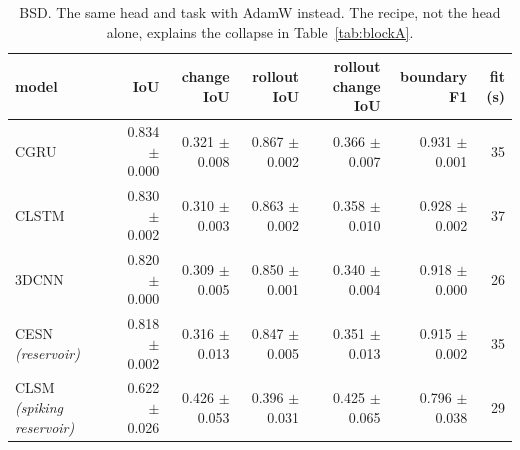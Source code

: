 \begin{table}[t]
\centering\small
\begin{tabular}{lrrrrrr}
\toprule
model & IoU & change IoU & rollout IoU & rollout change IoU & boundary F1 & fit (s) \\
\midrule
CGRU & 0.834 {\scriptsize$\pm$ 0.000} & 0.321 {\scriptsize$\pm$ 0.008} & 0.867 {\scriptsize$\pm$ 0.002} & 0.366 {\scriptsize$\pm$ 0.007} & 0.931 {\scriptsize$\pm$ 0.001} & 35 \\
CLSTM & 0.830 {\scriptsize$\pm$ 0.002} & 0.310 {\scriptsize$\pm$ 0.003} & 0.863 {\scriptsize$\pm$ 0.002} & 0.358 {\scriptsize$\pm$ 0.010} & 0.928 {\scriptsize$\pm$ 0.002} & 37 \\
3DCNN & 0.820 {\scriptsize$\pm$ 0.000} & 0.309 {\scriptsize$\pm$ 0.005} & 0.850 {\scriptsize$\pm$ 0.001} & 0.340 {\scriptsize$\pm$ 0.004} & 0.918 {\scriptsize$\pm$ 0.000} & 26 \\
CESN \emph{(reservoir)} & 0.818 {\scriptsize$\pm$ 0.002} & 0.316 {\scriptsize$\pm$ 0.013} & 0.847 {\scriptsize$\pm$ 0.005} & 0.351 {\scriptsize$\pm$ 0.013} & 0.915 {\scriptsize$\pm$ 0.002} & 35 \\
CLSM \emph{(spiking reservoir)} & 0.622 {\scriptsize$\pm$ 0.026} & 0.426 {\scriptsize$\pm$ 0.053} & 0.396 {\scriptsize$\pm$ 0.031} & 0.425 {\scriptsize$\pm$ 0.065} & 0.796 {\scriptsize$\pm$ 0.038} & 29 \\
\bottomrule
\end{tabular}
\caption{BSD. The same head and task with AdamW instead. The recipe, not the head alone, explains the collapse in Table~\ref{tab:blockA}.}
\label{tab:blockFbsd}
\end{table}

